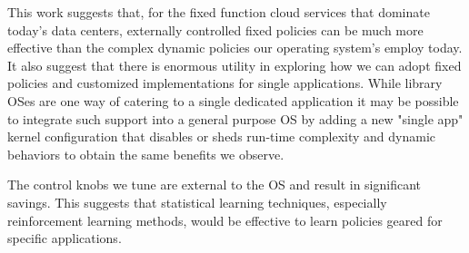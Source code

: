 
This work suggests that, for the fixed function cloud services that dominate today's data centers, externally controlled fixed policies can be much more effective than the complex dynamic policies our operating system's employ today.  It also suggest that there is enormous utility in exploring how we can adopt fixed policies and customized implementations for single applications. While library OSes are one way of catering to a single dedicated application it may be possible to integrate such support into a general purpose OS by adding a new "single app" kernel configuration that disables or sheds run-time complexity and dynamic behaviors to obtain the same benefits we observe.  

The control knobs we tune are external to the OS and result in significant savings. This suggests that statistical learning techniques, especially reinforcement learning methods, would be effective to learn policies geared for specific applications.
